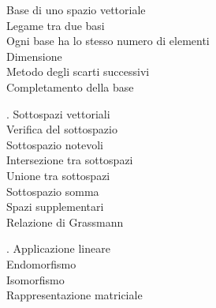 \documentclass[11pt,a4paper]{article}
\newcommand{\pagina}[1]{\clearpage}
\begin{document}
\begin{flushleft}
\textbullet{}   Base di uno spazio vettoriale\\
\textbullet{}   Legame tra due basi\\
\textbullet{}   Ogni base ha lo stesso numero di elementi\\
\textbullet{}   Dimensione\\
\textbullet{}   Metodo degli scarti successivi\\
\textbullet{}   Completamento della base\\
\par\smallskip
\par{}. Sottospazi vettoriali\\
\textbullet{}   Verifica del sottospazio\\
\textbullet{}   Sottospazio notevoli\\
\textbullet{}   Intersezione tra sottospazi\\
\textbullet{}   Unione tra sottospazi\\
\textbullet{}   Sottospazio somma\\
\textbullet{}   Spazi supplementari\\
\textbullet{}   Relazione di Grassmann\\
\par\smallskip
\par{}. Applicazione lineare\\
\textbullet{}   Endomorfismo\\
\textbullet{}   Isomorfismo\\
\textbullet{}   Rappresentazione matriciale\\
\end{flushleft}
\pagina{3}
\end{document}
